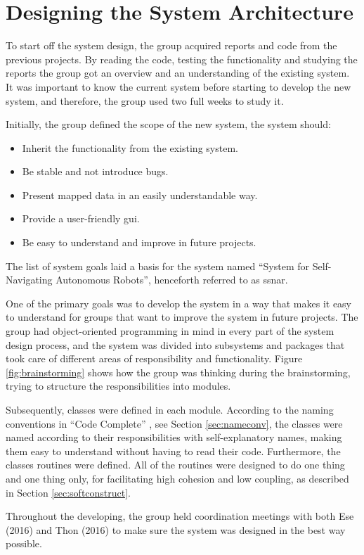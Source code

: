 \section{Designing the System Architecture}
To start off the system design, the group acquired reports and code from the previous projects. By reading the code, testing the functionality and studying the reports the group got an overview and an understanding of the existing system. It was important to know the current system before starting to develop the new system, and therefore, the group used two full weeks to study it.

Initially, the group defined the scope of the new system, the system should:
\begin{itemize}
    \item Inherit the functionality from the existing system.
    \item Be stable and not introduce bugs.
    \item Present mapped data in an easily understandable way.
    \item Provide a user-friendly \acrshort{gui}.
    \item Be easy to understand and improve in future projects.
\end{itemize}
The list of system goals laid a basis for the system named ``System for Self-Navigating Autonomous Robots'', henceforth referred to as \acrshort{ssnar}.

One of the primary goals was to develop the system in a way that makes it easy to understand for groups that want to improve the system in future projects. The group had object-oriented programming in mind in every part of the system design process,  and the system was divided into subsystems and packages that took care of different areas of responsibility and functionality. Figure \ref{fig:brainstorming} shows how the group was thinking during the brainstorming, trying to structure the responsibilities into modules. 

Subsequently, classes were defined in each module. According to the naming conventions in ``Code Complete'' \cite{stevemcconnell2004}, see Section \ref{sec:nameconv}, the classes were named according to their responsibilities with self-explanatory names, making them easy to understand without having to read their code. Furthermore, the classes routines were defined. All of the routines were designed to do one thing and one thing only, for facilitating high cohesion and low coupling, as described in Section \ref{sec:softconstruct}.

Throughout the developing, the group held coordination meetings with both Ese (2016) and Thon (2016) to make sure the system was designed in the best way possible.
